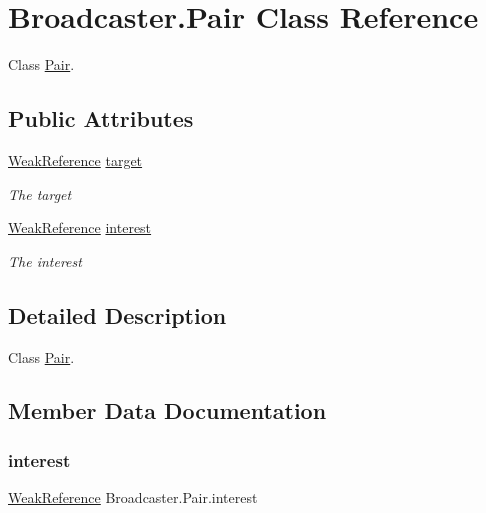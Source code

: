 \hypertarget{class_broadcaster_1_1_pair}{}\section{Broadcaster.\+Pair Class Reference}
\label{class_broadcaster_1_1_pair}


Class \hyperlink{class_broadcaster_1_1_pair}{Pair}.  


\subsection*{Public Attributes}
\begin{DoxyCompactItemize}
\item 
\hyperlink{class_weak_reference}{Weak\+Reference} \hyperlink{class_broadcaster_1_1_pair_ae3e5361ccca9a77940093ed3e9a62919}{target}
\begin{DoxyCompactList}\small\item\em The target \end{DoxyCompactList}\item 
\hyperlink{class_weak_reference}{Weak\+Reference} \hyperlink{class_broadcaster_1_1_pair_a30168423d2d6d05606be19d04ff0c697}{interest}
\begin{DoxyCompactList}\small\item\em The interest \end{DoxyCompactList}\end{DoxyCompactItemize}


\subsection{Detailed Description}
Class \hyperlink{class_broadcaster_1_1_pair}{Pair}. 



\subsection{Member Data Documentation}
\mbox{\label{class_broadcaster_1_1_pair_a30168423d2d6d05606be19d04ff0c697}} 
\subsubsection{\texorpdfstring{interest}{interest}}
{\footnotesize\ttfamily \hyperlink{class_weak_reference}{Weak\+Reference} Broadcaster.\+Pair.\+interest}



